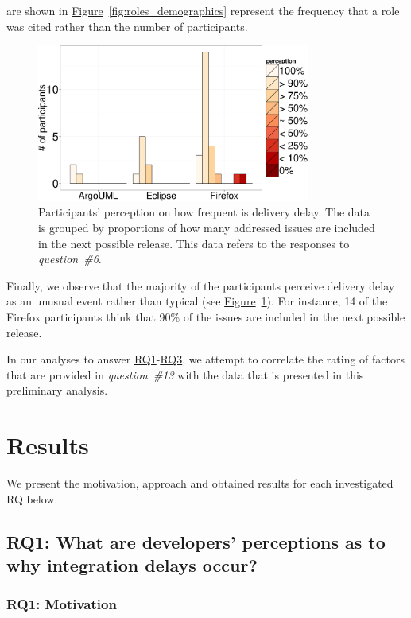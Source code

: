 are shown in
\hyperref[fig:roles_demographics]{Figure}~\ref{fig:roles_demographics} represent
the frequency that a role was cited rather than the number of participants.
\begin{figure}
	\centering
	\includegraphics[width=0.80\textwidth,keepaspectratio] 
	{chapters/chapter5/figures/delay_perception.pdf}
	\caption{Participants' perception on how frequent is delivery delay. The data is grouped by proportions of
		how many addressed issues are included in the next possible
		release. This data refers to the responses to {\em question~\#6}.}
	\label{fig:delay_perception}
\end{figure}
Finally, we observe that the majority of the participants perceive delivery delay as an unusual event rather than
typical (see \hyperref[fig:delay_perception]{Figure}~\ref{fig:delay_perception}). For instance, 14 of the Firefox
participants think that 90\% of the issues are included in the next possible release.

In our analyses to answer \hyperref[ch5:rq1]{RQ1}-\hyperref[ch5:rq3]{RQ3}, we
attempt to correlate the rating of factors that are provided in {\em
question~\#13} with the data that is presented in this preliminary analysis.

\section{Results} \label{ch6:results}

We present the motivation, approach and obtained results for each investigated
RQ below.

\subsection{RQ1: What are developers' perceptions as to why integration delays
occur?}\label{ch5:rq1}

\subsubsection*{RQ1: Motivation}


